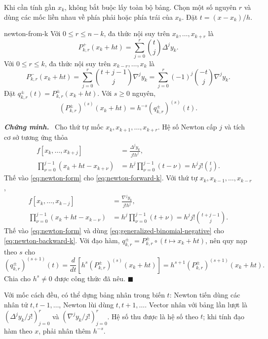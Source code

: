 \documentclass[12pt,a4paper,oneside]{book}
\numberwithin{algorithm}{chapter}
\theoremstyle{definition}
\newenvironment{chungminh}{\par\medskip\noindent\textbf{\textit{\color{mainblue}Chứng minh.}}\ }{\hfill$\blacksquare$\par\medskip}
\begin{document}
Khi cần tính gần $x_k$, không bắt buộc lấy toàn bộ bảng. Chọn một số nguyên $r$ và dùng các mốc liền nhau về phía phải hoặc phía trái của $x_k$. Đặt $t=(x-x_k)/h$.
\begin{menhde}{}{newton-from-k}
Với $0\leq r\leq n-k$, đa thức nội suy trên $x_k,\ldots,x_{k+r}$ là
\begin{equation}\label{eq:newton-forward-k}
 P_{k,r}^{+}(x_k+ht)=\sum_{j=0}^{r}\binom tj\Delta^jy_k.
\end{equation}
Với $0\leq r\leq k$, đa thức nội suy trên $x_{k-r},\ldots,x_k$ là
\begin{equation}\label{eq:newton-backward-k}
 P_{k,r}^{-}(x_k+ht)=\sum_{j=0}^{r}\binom{t+j-1}j\nabla^jy_k
 =\sum_{j=0}^{r}(-1)^j\binom{-t}j\nabla^jy_k.
\end{equation}
Đặt $q_{k,r}^{\pm}(t)=P_{k,r}^{\pm}(x_k+ht)$. Với $s\geq0$ nguyên,
\[
 (P_{k,r}^{\pm})^{(s)}(x_k+ht)=h^{-s}(q_{k,r}^{\pm})^{(s)}(t).
\]
\end{menhde}
\begin{chungminh}
Cho thứ tự mốc $x_k,x_{k+1},\ldots,x_{k+r}$. Hệ số Newton cấp $j$ và tích cơ sở tương ứng thỏa
\begin{align*}
 f[x_k,\ldots,x_{k+j}]&=\frac{\Delta^jy_k}{j!h^j},\\
 \prod_{\nu=0}^{j-1}(x_k+ht-x_{k+\nu})
 &=h^j\prod_{\nu=0}^{j-1}(t-\nu)=h^jj!\binom tj.
\end{align*}
Thế vào \eqref{eq:newton-form} cho \eqref{eq:newton-forward-k}. Với thứ tự $x_k,x_{k-1},\ldots,x_{k-r}$,
\begin{align*}
 f[x_k,\ldots,x_{k-j}]&=\frac{\nabla^jy_k}{j!h^j},\\
 \prod_{\nu=0}^{j-1}(x_k+ht-x_{k-\nu})
 &=h^j\prod_{\nu=0}^{j-1}(t+\nu)=h^jj!\binom{t+j-1}j.
\end{align*}
Thế vào \eqref{eq:newton-form} và dùng \eqref{eq:generalized-binomial-negative} cho \eqref{eq:newton-backward-k}. Với đạo hàm, $q_{k,r}^{\pm}=P_{k,r}^{\pm}\circ(t\mapsto x_k+ht)$, nên quy nạp theo $s$ cho
\[
 (q_{k,r}^{\pm})^{(s+1)}(t)
 =\frac d{dt}\left[h^s(P_{k,r}^{\pm})^{(s)}(x_k+ht)\right]
 =h^{s+1}(P_{k,r}^{\pm})^{(s+1)}(x_k+ht).
\]
Chia cho $h^s\ne0$ được công thức đã nêu.
\end{chungminh}
Với mốc cách đều, có thể dựng bảng nhân trong biến $t$: Newton tiến dùng các nhân tử $t,t-1,\ldots$, Newton lùi dùng $t,t+1,\ldots$. Vector nhân với bảng lần lượt là $(\Delta^jy_k/j!)_{j=0}^{r}$ và $(\nabla^jy_k/j!)_{j=0}^{r}$. Hệ số thu được là hệ số theo $t$; khi tính đạo hàm theo $x$, phải nhân thêm $h^{-s}$.
\end{document}
